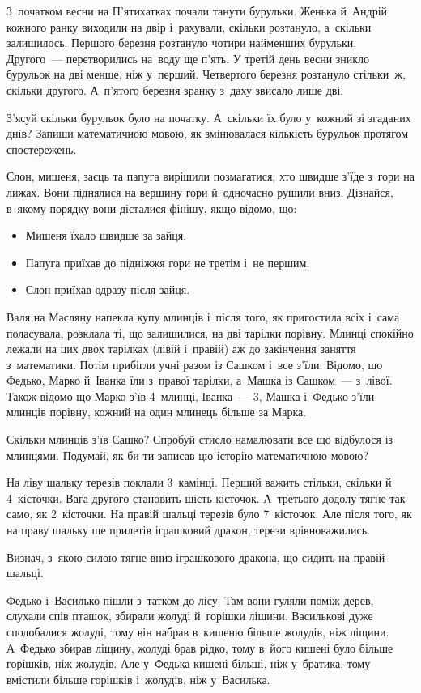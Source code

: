 \problem
З~початком весни на П'ятихатках почали танути бурульки.
Женька й~Андрій кожного ранку виходили на двір і~рахували, скільки розтануло,
а~скільки залишилось.
Першого березня розтануло чотири найменших бурульки.
Другого~--- перетворились на~воду ще п'ять.
У третій день весни зникло бурульок на дві менше, ніж у~перший.
Четвертого березня розтануло стільки~ж, скільки другого.
А~п'ятого березня зранку з~даху звисало лише дві.

З'ясуй скільки бурульок було на початку.
А~скільки їх було у~кожний зі згаданих днів?
Запиши математичною мовою, як змінювалася кількість бурульок
протягом спостережень.


\problem
Слон, мишеня, заєць та папуга вирішили позмагатися, хто швидше з'їде
з~гори на лижах. Вони піднялися на вершину гори й~одночасно рушили вниз.
Дізнайся, в~якому порядку вони дісталися фінішу, якщо відомо, що:
\begin{itemize}
    \item Мишеня їхало швидше за зайця.
    \item Папуга приїхав до підніжжя гори не третім і~не першим.
    \item Слон приїхав одразу після зайця.
\end{itemize}


\problem
Валя на Масляну напекла купу млинців і~після того, як пригостила всіх
і~сама поласувала, розклала ті, що залишилися, на дві тарілки порівну.
Млинці спокійно лежали на цих двох тарілках (лівій і~правій)
аж до закінчення заняття з~математики.
Потім прибігли учні разом із Сашком і~все з'їли.
Відомо, що Федько, Марко й~Іванка їли з~правої тарілки,
а~Машка із Сашком~--- з~лівої.
Також відомо що Марко з'їв 4~млинці, Іванка~--- 3,
Машка і~Федько з'їли млинців порівну, кожний на один млинець більше за Марка.

Скільки млинців з'їв Сашко?
Спробуй стисло намалювати все що відбулося із млинцями.
Подумай, як би ти записав цю історію математичною мовою?


\problem
На ліву шальку терезів поклали 3~камінці.
Перший важить стільки, скільки й 4~кісточки.
Вага другого становить шість кісточок.
А~третього додолу тягне так само, як 2~кісточки.
На правій шальці терезів було 7~кісточок.
Але після того, як на праву шальку ще прилетів іграшковий дракон,
терези врівноважились.

Визнач, з~якою силою тягне вниз іграшкового дракона,
що сидить на правій шальці.


\problem
Федько і~Василько пішли з~татком до лісу.
Там вони гуляли поміж дерев, слухали спів пташок,
збирали жолуді й~горішки ліщини.
Василькові дуже сподобалися жолуді, тому він набрав в~кишеню більше
жолудів, ніж ліщини. А~Федько збирав ліщину, жолуді брав рідко,
тому в~його кишені було більше горішків, ніж жолудів.
Але у~Федька кишені більші, ніж у~братика, тому вмістили
більше горішків і~жолудів, ніж у~Василька.

